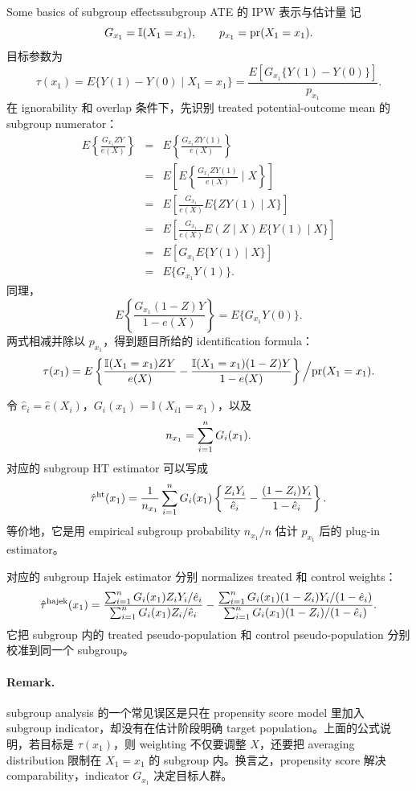\begin{exercisesolution}{Some basics of subgroup effects}{subgroup ATE 的 IPW 表示与估计量}
记
\[
G_{x_1}=\mathbb{I}(X_1=x_1),\qquad p_{x_1}=\textup{pr}(X_1=x_1).
\]
目标参数为
\[
\tau(x_1)=E\{Y(1)-Y(0)\mid X_1=x_1\}
=\frac{E[G_{x_1}\{Y(1)-Y(0)\}]}{p_{x_1}}.
\]
在 ignorability 和 overlap 条件下，先识别 treated potential-outcome mean 的 subgroup numerator：
\begin{eqnarray*}
E\left\{\frac{G_{x_1}ZY}{e(X)}\right\}
&=&E\left\{\frac{G_{x_1}ZY(1)}{e(X)}\right\}\\
&=&E\left[E\left\{\frac{G_{x_1}ZY(1)}{e(X)}\mid X\right\}\right]\\
&=&E\left[\frac{G_{x_1}}{e(X)}E\{ZY(1)\mid X\}\right]\\
&=&E\left[\frac{G_{x_1}}{e(X)}E(Z\mid X)E\{Y(1)\mid X\}\right]\\
&=&E[G_{x_1}E\{Y(1)\mid X\}]\\
&=&E\{G_{x_1}Y(1)\}.
\end{eqnarray*}
同理，
\[
E\left\{\frac{G_{x_1}(1-Z)Y}{1-e(X)}\right\}
=E\{G_{x_1}Y(0)\}.
\]
两式相减并除以 $p_{x_1}$，得到题目所给的 identification formula：
\[
\tau(x_1)
=E\left\{
\frac{\mathbb{I}(X_1=x_1)ZY}{e(X)}
-\frac{\mathbb{I}(X_1=x_1)(1-Z)Y}{1-e(X)}
\right\}\Big/\textup{pr}(X_1=x_1).
\]

令 $\hat e_i=\hat e(X_i)$，$G_i(x_1)=\mathbb{I}(X_{i1}=x_1)$，以及
\[
n_{x_1}=\sum_{i=1}^n G_i(x_1).
\]
对应的 subgroup HT estimator 可以写成
\[
\hat\tau^{\textup{ht}}(x_1)
=\frac{1}{n_{x_1}}\sum_{i=1}^n G_i(x_1)
\left\{
\frac{Z_iY_i}{\hat e_i}
-\frac{(1-Z_i)Y_i}{1-\hat e_i}
\right\}.
\]
等价地，它是用 empirical subgroup probability $n_{x_1}/n$ 估计 $p_{x_1}$ 后的 plug-in estimator。

对应的 subgroup Hajek estimator 分别 normalizes treated 和 control weights：
\[
\hat\tau^{\textup{hajek}}(x_1)
=
\frac{\sum_{i=1}^n G_i(x_1)Z_iY_i/\hat e_i}
{\sum_{i=1}^n G_i(x_1)Z_i/\hat e_i}
-
\frac{\sum_{i=1}^n G_i(x_1)(1-Z_i)Y_i/(1-\hat e_i)}
{\sum_{i=1}^n G_i(x_1)(1-Z_i)/(1-\hat e_i)}.
\]
它把 subgroup 内的 treated pseudo-population 和 control pseudo-population 分别校准到同一个 subgroup。

\paragraph{Remark.}
subgroup analysis 的一个常见误区是只在 propensity score model 里加入 subgroup indicator，却没有在估计阶段明确 target population。上面的公式说明，若目标是 $\tau(x_1)$，则 weighting 不仅要调整 $X$，还要把 averaging distribution 限制在 $X_1=x_1$ 的 subgroup 内。换言之，propensity score 解决 comparability，indicator $G_{x_1}$ 决定目标人群。
\end{exercisesolution}
